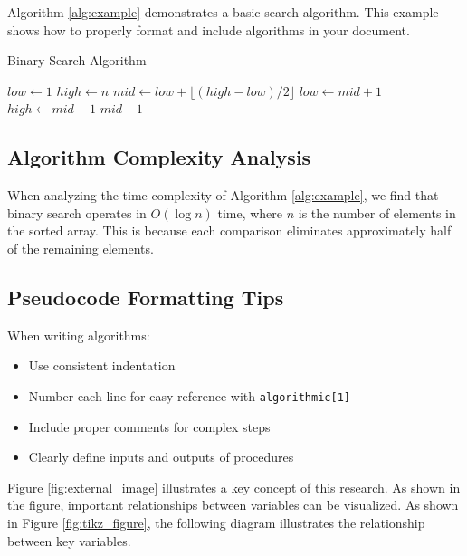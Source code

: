 \documentclass[12pt,a4paper]{report}
\begin{document}
\begin{spacing}{1.5}
    Algorithm \ref{alg:example} demonstrates a basic search algorithm. This example shows how to properly format and include algorithms in your document.

    \begin{algorithm}
        \caption{Binary Search Algorithm}
        \label{alg:example}
        \begin{algorithmic}[1]
            \State $low \gets 1$
            \State $high \gets n$
            \State $mid \gets low + \lfloor (high - low) / 2 \rfloor$ 
            \State $low \gets mid + 1$
            \State $high \gets mid - 1$
            \Else
            \State \Return $mid$
            \EndIf
            \EndWhile
            \State \Return $-1$
            \EndProcedure
        \end{algorithmic}
    \end{algorithm}

    \subsection{Algorithm Complexity Analysis}
    When analyzing the time complexity of Algorithm \ref{alg:example}, we find that binary search operates in $O(\log n)$ time, where $n$ is the number of elements in the sorted array. This is because each comparison eliminates approximately half of the remaining elements.

    \subsection{Pseudocode Formatting Tips}
    When writing algorithms:
    \begin{itemize}
        \item Use consistent indentation
        \item Number each line for easy reference with \texttt{algorithmic[1]}
        \item Include proper comments for complex steps
        \item Clearly define inputs and outputs of procedures
    \end{itemize}

    Figure \ref{fig:external_image} illustrates a key concept of this research. As shown in the figure, important relationships between variables can be visualized.
    As shown in Figure \ref{fig:tikz_figure}, the following diagram illustrates the relationship between key variables.


\end{spacing}
\end{document}
